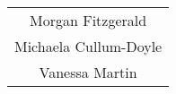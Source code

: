 \def\arraystretch{1.25}
\begin{tabular}{c}	
	Morgan Fitzgerald \\
	Michaela Cullum-Doyle \\
	Vanessa Martin \\	
\end{tabular}